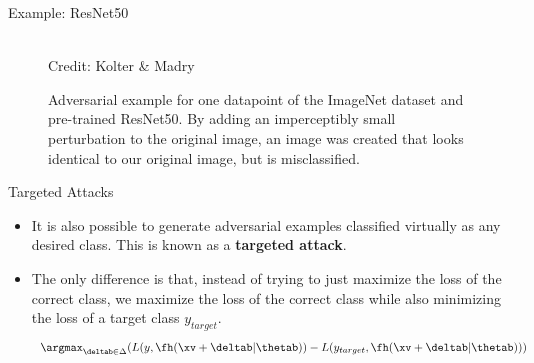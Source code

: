\begin{frame} {Example: ResNet50}
  \begin{figure}
    \centering
     \tiny{\\Credit: Kolter \& Madry}
     \vspace{-0.2cm}
      \caption{Adversarial example for one datapoint of the ImageNet dataset and pre-trained ResNet50. By adding an imperceptibly small perturbation to the original image,  an image was created that looks identical to our original image, but is misclassified.}
  \end{figure}
\end{frame}

\begin{frame}{Targeted Attacks}
    \begin{itemize}
        \item It is also possible to generate adversarial examples classified virtually as any desired class. This is known as a \textbf{targeted attack}.
        \item The only difference is that, instead of trying to just maximize the loss of the correct class, we maximize the loss of the correct class while also minimizing the loss of a target class $y_{target}$.
        \begin{equation*}
             \argmax_{\deltab \in \Delta} ( L(y, \fh(\xv + \deltab| \thetab)) - L(y_{target}, \fh(\xv + \deltab| \thetab)) )
        \end{equation*}
    \end{itemize}
\end{frame}
  
